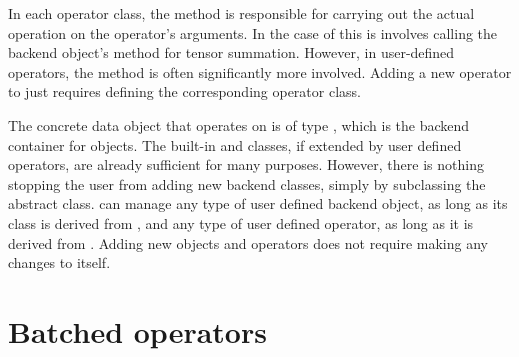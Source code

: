 \mbox{} 

In each operator class, the  method is responsible for carrying out the actual operation on 
the operator's arguments. In the case of  this is  
involves calling the backend object's method for tensor summation. 
However, in user-defined operators, the  method is often significantly more involved. 
Adding a new operator to \Cengine{} just requires defining the corresponding operator class. 

The concrete data object that  operates on is of type , 
which is the backend container for  objects. 
The built-in  and  classes, if extended by user defined operators, 
are already sufficient for many purposes. 
However, there is nothing stopping the user from adding new backend classes, simply 
by subclassing the  abstract class. 
\Cengine{} can manage any type of user defined backend object, as long as its class is derived from 
, and any type of user defined operator, as long as it is derived from 
. 
Adding new objects and operators does not require making any changes to \Cengine{} itself.  

\clearpage
\section*{Batched operators}

